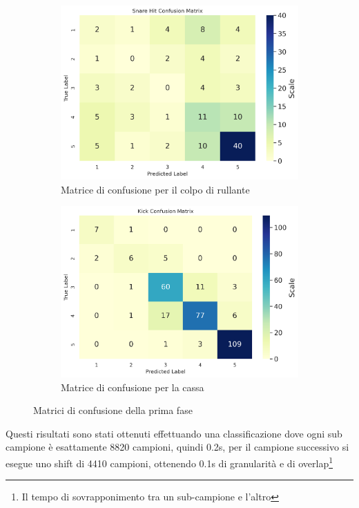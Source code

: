 \begin{figure}[h!]
	\begin{subfigure}{.5\linewidth}
		\includegraphics[width=\linewidth]{./immagini/second_classification/sn_hit_cm.png}
		\caption{Matrice di confusione per il colpo di rullante}
		\label{fig:cm_2c}
	\end{subfigure}\hfill
	\begin{subfigure}{.5\linewidth}
		\includegraphics[width=\linewidth]{./immagini/second_classification/kick_cm.png}
		\caption{Matrice di confusione per la cassa}
		\label{fig:cm_2d}
	\end{subfigure}
	\caption{Matrici di confusione della prima fase}
	\label{fig:cm_2}
\end{figure}

Questi risultati sono stati ottenuti effettuando una classificazione dove ogni sub campione è esattamente 8820 campioni, quindi 0.2s, per il campione successivo si esegue uno shift di 4410 campioni, ottenendo 0.1s di granularità e di overlap\footnote{Il tempo di sovrapponimento tra un sub-campione e l'altro}\\

